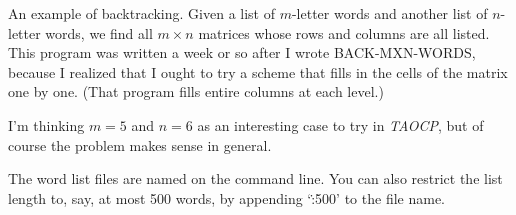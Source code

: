 
\hypertextrue\srcloctrue

An example of backtracking. Given a list of
$m$-letter words and another
list of $n$-letter words, we find all $m\times n$ matrices whose rows and
columns are all listed. This program was written a week or so after I wrote
{\mc BACK-MXN-WORDS}, because I realized that I ought to try a scheme
that fills in the cells of the matrix one by one. (That program
fills entire columns at each level.)

I'm thinking $m=5$ and $n=6$ as an interesting case to try in {\sl TAOCP},
but of course the problem makes sense in general.

The word list files are named on the command line. You can also restrict
the list length to, say, at most 500 words, by appending `\.{:500}' to
the file name.

